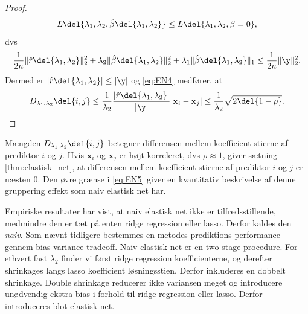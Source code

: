 \begin{proof}
\begin{align*}
L \del{\lambda_1,\lambda_2, \hat{\beta}\del{\lambda_1, \lambda_2}} \leq L \del{\lambda_1,\lambda_2, \beta = 0},  
\end{align*}
dvs
\begin{align*}
\frac{1}{2n} \Vert \hat{r} \del{\lambda_1, \lambda_2} \Vert_2^2 + \lambda_2 \Vert \hat{\beta} \del{\lambda_1, \lambda_2} \Vert_2^2 + \lambda_1 \Vert \hat{\beta} \del{\lambda_1, \lambda_2} \Vert_1 \leq \frac{1}{2n} \Vert \y \Vert_2^2.  
\end{align*}
Dermed er \(\vert \hat{r} \del{\lambda_1, \lambda_2} \vert \leq \vert \y \vert\) og \eqref{eq:EN4} medfører, at
\begin{align*}
D_{\lambda_1, \lambda_2} \del{i,j} \leq \frac{1}{\lambda_2} \frac{\vert \hat{r} \del{\lambda_1, \lambda_2} \vert}{\vert \y \vert} \vert \mathbf{x}_i - \mathbf{x}_j \vert  \leq \frac{1}{\lambda_2} \sqrt{2 \del{1-\rho}}.
\end{align*}
\end{proof}
Mængden \(D_{\lambda_1, \lambda_2} \del{i,j}\) betegner differensen mellem koefficient stierne af prediktor \(i\) og \(j\).
Hvis \(\mathbf{x}_i\) og \(\mathbf{x}_j\) er højt korreleret, dvs \(\rho \approx 1\), giver sætning \ref{thm:elastisk_net}, at differensen mellem koefficient stierne af prediktor \(i\) og \(j\) er næsten 0.
Den øvre grænse i \eqref{eq:EN5} giver en kvantitativ beskrivelse af denne gruppering effekt som naiv elastisk net har.

Empiriske resultater har vist, at naiv elastisk net ikke er tilfredsstillende, medmindre den er tæt på enten ridge regression eller lasso.
Derfor kaldes den \textit{naiv}.
Som nævnt tidligere bestemmes en metodes prediktions performance gennem bias-variance tradeoff. 
Naiv elastisk net er en two-stage procedure. For ethvert fast \(\lambda_2\) finder vi først ridge regression koefficienterne, og derefter shrinkages langs lasso koefficient løsningsstien. Derfor inkluderes en dobbelt shrinkage.
Double shrinkage reducerer ikke variansen meget og introducere unødvendig ekstra bias i forhold til ridge regression eller lasso.
Derfor introduceres blot elastisk net.

